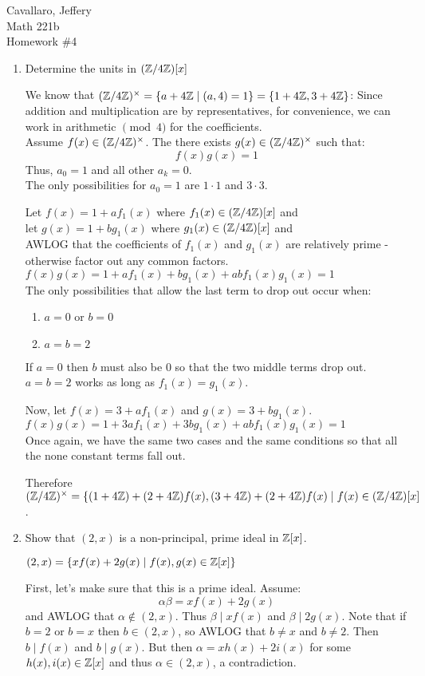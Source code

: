 \documentclass[letterpaper,12pt,fleqn]{article}
\renewcommand{\a}{\alpha}
\renewcommand{\b}{\beta}
\newcommand{\x}{\times}
\begin{document}
Cavallaro, Jeffery \\
Math 221b \\
Homework \#4

\bigskip

\begin{enumerate}
\item Determine the units in $(\mathbb{Z}/4\mathbb{Z})[x]$

  We know that $(\Z/4\Z)^{\x}=\{a+4\Z\mid(a,4)=1\}=\{1+4\Z,3+4\Z\}$:
  Since addition and multiplication are by representatives, for convenience, we can work
  in arithmetic $\pmod 4$ for the coefficients. \\
  Assume $f(x)\in(\Z/4\Z)^{\x}$. The there exists $g(x)\in(\Z/4\Z)^{\x}$ such that:
  \[f(x)g(x)=1\]
  Thus, $a_0=1$ and all other $a_k=0$. \\
  The only possibilities for $a_0=1$ are $1\cdot1$ and $3\cdot3$.

  Let $f(x)=1+af_1(x)$ where $f_1(x)\in(\mathbb{Z}/4\mathbb{Z})[x]$ and \\
  let $g(x)=1+bg_1(x)$ where $g_1(x)\in(\mathbb{Z}/4\mathbb{Z})[x]$ and \\
  AWLOG that the coefficients of $f_1(x)$ and $g_1(x)$ are relatively prime - otherwise
  factor out any common factors. \\
  $f(x)g(x)=1+af_1(x)+bg_1(x)+abf_1(x)g_1(x)=1$ \\
  The only possibilities that allow the last term to drop out occur when:
  \begin{enumerate}
  \item $a=0$ or $b=0$
  \item $a=b=2$
  \end{enumerate}
  If $a=0$ then $b$ must also be 0 so that the two middle terms drop out. $a=b=2$ works
  as long as $f_1(x)=g_1(x)$.
  
  Now, let $f(x)=3+af_1(x)$ and $g(x)=3+bg_1(x)$. \\
  $f(x)g(x)=1+3af_1(x)+3bg_1(x)+abf_1(x)g_1(x)=1$ \\
  Once again, we have the same two cases and the same conditions so that all the none
  constant terms fall out.

  Therefore $(\Z/4\Z)^{\x}=
  \{(1+4\Z)+(2+4\Z)f(x),(3+4\Z)+(2+4\Z)f(x)\mid f(x)\in(\Z/4\Z)[x]$.

\item Show that $(2,x)$ is a non-principal, prime ideal in $\mathbb{Z}[x]$.

  $(2,x)=\{xf(x)+2g(x)\mid f(x),g(x)\in\mathbb{Z}[x]\}$

  First, let's make sure that this is a prime ideal. Assume:
  \[\a\b=xf(x)+2g(x)\]
  and AWLOG that $\a\notin(2,x)$. Thus $\b\mid xf(x)$ and $\b\mid 2g(x)$. Note that if
  $b=2$ or $b=x$ then $b\in(2,x)$, so AWLOG that $b\ne x$ and $b\ne 2$. Then
  $b\mid f(x)$ and $b\mid g(x)$. But then $\a=xh(x)+2i(x)$ for some $h(x),i(x)\in\mathbb{Z}[x]$
  and thus $\a\in(2,x)$, a contradiction.


\end{enumerate}
\end{document}
